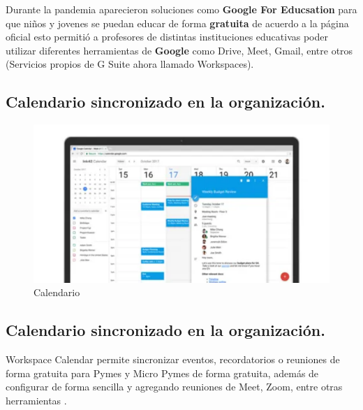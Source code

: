 \documentclass[
  letterpaper,
  DIV=11,
  numbers=noendperiod]{scrartcl}
\begin{document}
Durante la pandemia aparecieron soluciones como \textbf{Google For
Educsation} para que niños y jovenes se puedan educar de forma
\textbf{gratuita} de acuerdo a la página oficial
\textcite{SolucionesDisenadasPara2022} esto permitió a profesores de
distintas instituciones educativas poder utilizar diferentes
herramientas de \textbf{Google} como Drive, Meet, Gmail, entre otros
(Servicios propios de G Suite ahora llamado Workspaces).

\hypertarget{calendario-sincronizado-en-la-organizaciuxf3n.}{%
\subsection{Calendario sincronizado en la
organización.}\label{calendario-sincronizado-en-la-organizaciuxf3n.}}

\begin{figure}

{\centering \includegraphics{media/calendario.png}

}

\caption{Calendario}

\end{figure}

\hypertarget{calendario-sincronizado-en-la-organizaciuxf3n.-1}{%
\subsection{Calendario sincronizado en la
organización.}\label{calendario-sincronizado-en-la-organizaciuxf3n.-1}}

Workspace Calendar permite sincronizar eventos, recordatorios o
reuniones de forma gratuita para Pymes y Micro Pymes de forma gratuita,
además de configurar de forma sencilla y agregando reuniones de Meet,
Zoom, entre otras herramientas
\textcite{CalendarioGoogleCalendarios2022}.
\end{document}
